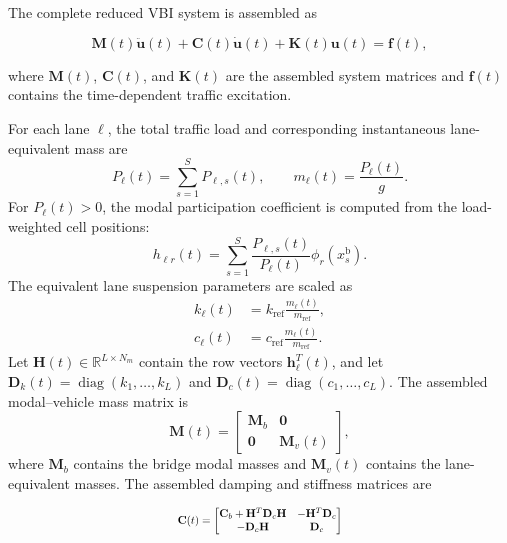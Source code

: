 \documentclass[journal]{IEEEtran}
\begin{document}
The complete reduced
VBI system is assembled as

\begin{equation}
\mathbf{M}(t)\ddot{\mathbf{u}}(t)
+
\mathbf{C}(t)\dot{\mathbf{u}}(t)
+
\mathbf{K}(t)\mathbf{u}(t)
=
\mathbf{f}(t),
\end{equation}

where $\mathbf{M}(t)$, $\mathbf{C}(t)$, and $\mathbf{K}(t)$ are the assembled
system matrices and $\mathbf{f}(t)$ contains the
time-dependent traffic excitation.

For each lane $\ell$, the total traffic load and corresponding
instantaneous lane-equivalent mass are
\begin{equation}
P_{\ell}(t)=\sum_{s=1}^{S}P_{\ell,s}(t),\qquad
m_{\ell}(t)=\frac{P_{\ell}(t)}{g}.
\label{eq:lane_equiv_mass}
\end{equation}
For $P_{\ell}(t)>0$, the modal participation coefficient is
computed from the load-weighted cell positions:
\begin{equation}
h_{\ell r}(t)=\sum_{s=1}^{S}
\frac{P_{\ell,s}(t)}{P_{\ell}(t)}
\phi_r\!\left(x_s^{\mathrm{b}}\right).
\label{eq:lane_modal_participation}
\end{equation}
The equivalent lane suspension parameters are scaled as
\begin{equation}
\begin{aligned}
k_{\ell}(t)&=k_{\mathrm{ref}}
\frac{m_{\ell}(t)}{m_{\mathrm{ref}}},\\
c_{\ell}(t)&=c_{\mathrm{ref}}
\frac{m_{\ell}(t)}{m_{\mathrm{ref}}}.
\end{aligned}
\label{eq:lane_equiv_properties}
\end{equation}
Let $\mathbf{H}(t)\in\mathbb{R}^{L\times N_m}$ contain the
row vectors $\mathbf{h}_{\ell}^{T}(t)$, and let
$\mathbf{D}_k(t)=\operatorname{diag}(k_1,\ldots,k_L)$ and
$\mathbf{D}_c(t)=\operatorname{diag}(c_1,\ldots,c_L)$.
The assembled modal--vehicle mass matrix is
\begin{equation}
\mathbf{M}(t)=
\begin{bmatrix}
\mathbf{M}_b & \mathbf{0}\\
\mathbf{0} & \mathbf{M}_v(t)
\end{bmatrix},
\label{eq:assembled_mass}
\end{equation}
where $\mathbf{M}_b$ contains the bridge modal masses and
$\mathbf{M}_v(t)$ contains the lane-equivalent masses.
The assembled damping and stiffness matrices are

\begin{equation}
\scalebox{0.78}{$\displaystyle
\mathbf{C}(t)=
\begin{bmatrix}
\mathbf{C}_b+\mathbf{H}^{T}\mathbf{D}_c\mathbf{H}
&
-\mathbf{H}^{T}\mathbf{D}_c\\
-\mathbf{D}_c\mathbf{H}
&
\mathbf{D}_c
\end{bmatrix}
$}
\label{eq:assembled_damping}
\end{equation}
\end{document}
